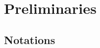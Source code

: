 \documentclass[letterpaper]{article} %
\begin{document}
    




    


    
\section{Preliminaries}
    \subsection{Notations}
\end{document}
